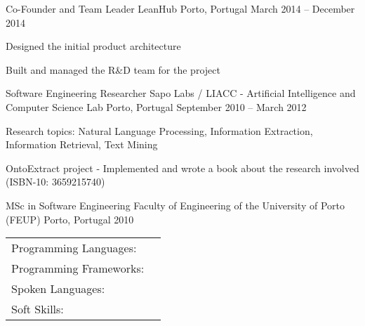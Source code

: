 \documentclass[]{awesome-cv}
\begin{document}
\begin{cventries}
	\vspace{-4mm}
	\cventry
	{Co-Founder and Team Leader}
	{LeanHub}
	{Porto, Portugal}
	{March 2014 – December 2014}
	{\begin{cvitems}
		\item {Designed the initial product architecture}
		\item {Built and managed the R\&D team for the project}
		\end{cvitems}}
	
	\vspace{-4mm}
	\cventry
	{Software Engineering Researcher}
	{Sapo Labs / LIACC - Artificial Intelligence and Computer Science Lab}
	{Porto, Portugal}
	{September 2010 – March 2012}
	{\begin{cvitems}
		\item {Research topics: Natural Language Processing, Information Extraction, Information Retrieval, Text Mining}
		\item {OntoExtract project - Implemented and wrote a book about the research involved (ISBN-10: 3659215740)}
		\end{cvitems}}
\end{cventries}
\vspace{-5mm}
\begin{cventries}
	\cventry
	{MSc in Software Engineering}
	{Faculty of Engineering of the University of Porto (FEUP)}
	{Porto, Portugal}
	{2010}
	{}
\end{cventries}

\vspace{-6mm}
\begin{cventries}
	\vspace{-2mm}
	\cventry
	{}
	{\def\arraystretch{1.15}{\begin{tabular}{ l l }
		Programming Languages:  & {\skill{ Hack, Kotlin, Java, JavaScript, Perl, SQL, PHP, C++}} \\
		Programming Frameworks:  & {\skill{ React, React Native, Android, ionic, jQuery, Laravel, Vue.js, Quasar, Play Framework}} \\
		Spoken Languages:  & {\skill{ English, Portuguese, French, Spanish, Slovene}} \\
		Soft Skills:  & {\skill{ Ability to Work Under Pressure, Self-motivation, Creativity, Good communication}} \\
		\end{tabular}}}
	{}
	{}
	{}
\end{cventries}
\end{document}
